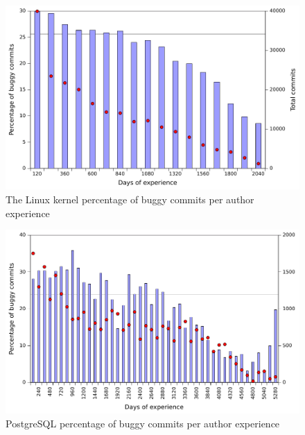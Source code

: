 \begin{figure}
\begin{center}
\includegraphics[width=\columnwidth]{linux-bugginess-experience.pdf}
\end{center}
\caption{The Linux kernel percentage of buggy commits per author experience}
\label{fig-linux-bugginess-experience}
\end{figure}

\begin{figure}
\begin{center}
\includegraphics[width=\columnwidth]{postgresql-bugginess-experience.pdf}
\end{center}
\caption{PostgreSQL percentage of buggy commits per author experience}
\label{fig-postgresql-bugginess-experience}
\end{figure}


